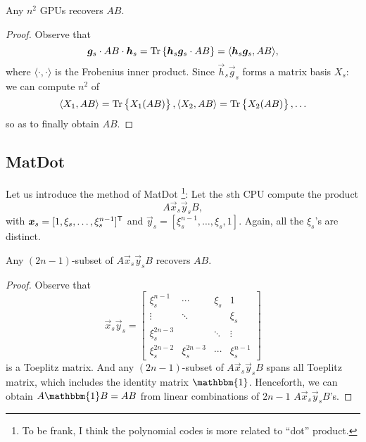 \begin{theorem}
    Any $n^2$ GPUs recovers $AB$.
\end{theorem}
\begin{proof}
    Observe that
    \begin{equation*}
        \boldsymbol{g}_s\cdot AB\cdot \boldsymbol{h}_s = \mathrm{Tr}\left\{{\boldsymbol{h}_s\boldsymbol{g}_s\cdot AB}\right\} = \langle \boldsymbol{h}_s\boldsymbol{g}_s,AB\rangle,
    \end{equation*}
    where $\langle\cdot,\cdot\rangle$ is the Frobenius inner product. Since $\vec{h}_s\vec{g}_s$ forms a matrix basis $X_s$: we can compute $n^2$ of
    \begin{equation*}
        \langle X_1,AB\rangle = \mathrm{Tr}\left\{{X_1(AB)}\right\}, \langle X_2,AB\rangle = \mathrm{Tr}\left\{{X_2(AB)}\right\}, \ldots
    \end{equation*}
    so as to finally obtain $AB$.
\end{proof}

\subsection{MatDot}
Let us introduce the method of MatDot \cite{MatDot}\footnote{To be frank, I think the polynomial codes is more related to ``dot'' product.}: Let the $s$th CPU compute the product
\begin{equation}
    A\vec{x}_s\vec{y}_sB,
\end{equation}
with $\boldsymbol{x}_s = [1,\xi_s,\ldots,\xi_s^{n-1}]^{\mathsf{T}}$ and $\vec{y}_s = [\xi_s^{n-1},\ldots,\xi_s,1]$. Again, all the $\xi_s$'s are distinct.

\begin{theorem}[MatDot]
    Any $(2n-1)$-subset of $A\vec{x}_s\vec{y}_sB$ recovers $AB$.
\end{theorem}
\begin{proof}
    Observe that
    \begin{equation*}
        \vec{x}_s\vec{y}_s = \left[\begin{matrix}
            \xi_s^{n-1} & \cdots & \xi_s & 1 \\
            \vdots & \ddots & & \xi_s \\
            \xi_s^{2n-3} & & \ddots & \vdots \\
            \xi_s^{2n-2} & \xi_s^{2n-3} & \cdots & \xi_s^{n-1}
        \end{matrix}\right]
    \end{equation*}
    is a Toeplitz matrix. And any $(2n-1)$-subset of $A\vec{x}_s\vec{y}_sB$ spans all Toeplitz matrix, which includes the identity matrix $\mathbbm{1}$. Henceforth, we can obtain $A\mathbbm{1}B=AB$ from linear combinations of $2n-1$ $A\vec{x}_s\vec{y}_sB$'s.
\end{proof}

